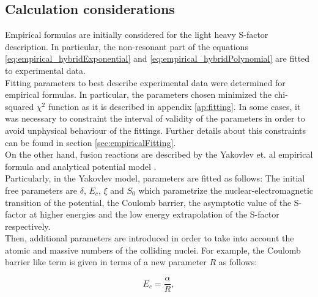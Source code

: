 \documentclass[openany]{book}
\begin{document}
 
 
\subsection{Calculation considerations} \label{sub:considerationsNonResonant}

Empirical formulas are initially considered for the light heavy S-factor description. In particular, the non-resonant part of the equations \ref{eq:empirical_hybridExponential}  and \ref{eq:empirical_hybridPolynomial} are fitted to experimental data.  \\

Fitting parameters to best describe experimental data were determined for empirical formulas. In particular, the parameters chosen minimized the chi-squared $\chi^2$ function as it is described in appendix \ref{ap:fitting}. In some cases, it was necessary to constraint the interval of validity of the parameters in order to avoid unphysical behaviour of the fittings. Further details about this constraints can be found in section \ref{sec:empiricalFitting}. \\

On the other hand, fusion reactions are described by the Yakovlev et. al empirical formula \cite{beard_afanasjev_chamon_gasques_wiescher_yakovlev_2010} and analytical potential model  \cite{yakovlev_beard_gasques_wiescher_2010}.  \\

Particularly, in the Yakovlev model, parameters are fitted as follows: The initial free parameters are $\delta$, $E_c$,  $\xi$ and $S_0$ which parametrize the nuclear-electromagnetic transition of the potential, the Coulomb barrier, the asymptotic value of the S-factor at higher energies and the low energy extrapolation of the S-factor respectively.  \\

Then, additional parameters are introduced in order to take into account the atomic and massive numbers of the colliding nuclei. For example, the Coulomb barrier like term is given in terms of a new parameter $R$ as follows:

\begin{equation} \label{eq:potential_Yakovlev_Ec}
	E_c = \frac{\alpha}{R},
\end{equation}
\end{document}
